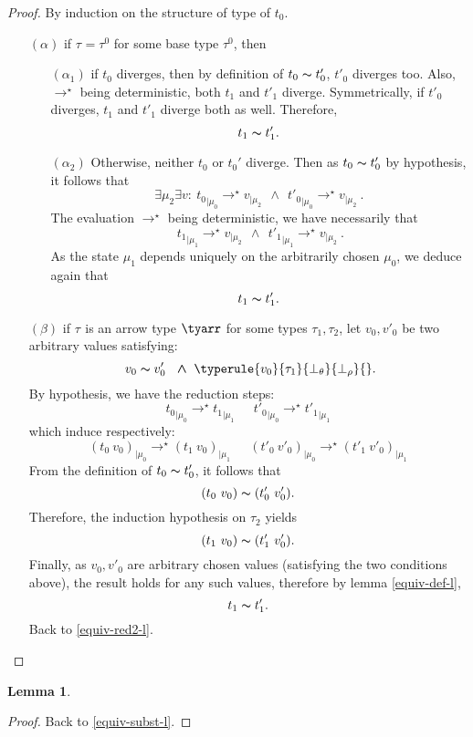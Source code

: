 \documentclass[a4paper,11pt,oneside]{article}
\theoremstyle{plain}
\newtheorem{lemma}[definition]{Lemma}
\newcommand{\tmapp}[2]{(#1 ~ #2)}
\newcommand{\ty}[1][]{\tau_{#1}}
\newcommand{\bwedge}{\boldsymbol{~\wedge~}}
\newcommand{\bth}{\bot_\theta}
\newcommand{\brh}{\bot_\rho}
\newcommand{\evalstar}[4]{~#1_{|\mu_#2} \rightarrow^{\star} #3_{|\mu_#4} ~}
\newcommand{\eqv}[1]{#1 \thicksim #1'}
\begin{document}
	\begin{proof}
		By induction on the structure of type of $t_0$. 
		\begin{itemize}
		\item[$(\alpha)$] if $\ty = \ty^0$ for some base type $\ty^0$, then
		
			\begin{itemize}
			\item[$(\alpha_1)$] if $t_0$ diverges, then by definition of 
			$\eqv{t_0}$, $t'_0$ diverges too. Also, $\rightarrow^\star$ being 
			deterministic, both $t_1$ and $t'_1$ diverge. Symmetrically, if 
			$t'_0$ diverges, $t_1$ and $t'_1$ diverge both as well. Therefore,
			$$\eqv{t_1}.$$
						
			\item[$(\alpha_2)$] Otherwise, neither $t_0$ or $t_{0}'$ diverge. Then
				as $\eqv{t_0}$ by hypothesis, it follows that 
					$$ \exists \mu_2 \exists v: 
					\evalstar{{t_0}}{0}{v}{2} \bwedge \evalstar{{t'_0}}{0}{v}{2}.$$
				The evaluation $\rightarrow^\star$ being deterministic, we have 
				necessarily that
					$$\evalstar{{t_1}}{1}{v}{2} \bwedge \evalstar{{t'_1}}{1}{v}{2}.$$
				As the state $\mu_1$ depends uniquely on the arbitrarily chosen 
				$\mu_0$, we deduce again that $$\eqv{t_1}.$$					
			\end{itemize}			
			
		\item[$(\beta)$] if $\ty$ is an arrow type $\tyarr$ for some types 
		$\ty[1], \ty[2]$,	let $v_0, v'_0$ be two arbitrary values satisfying:
		$$~\eqv{v_0}~\bwedge \typerule{v_0}{\ty[1]}{\bth}{\brh}{}.$$
		By hypothesis, we have the reduction steps:
		$$\evalstar{{t_0}}{0}{{t_1}}{1}\quad\evalstar{{t'_0}}{0}{{t'_1}}{1}$$						which induce respectively: 
		$$\evalstar{\tmapp{t_0}{v_0}}{0}{\tmapp{t_1}{v_0}}{1} \quad
		\evalstar{\tmapp{t'_0}{v'_0}}{0}{\tmapp{t'_1}{v'_0}}{1}$$	
		From the definition of $\eqv{t_0}$, it follows that
		$${\tmapp{t_0}{v_0}} \thicksim {\tmapp{t'_0}{v'_0}}.$$
		Therefore, the induction hypothesis on $\ty[2]$ yields 
		$${\tmapp{t_1}{v_0}}\thicksim{\tmapp{t'_1}{v'_0}}.$$
		Finally, as $v_0, v'_0$ are arbitrary chosen values (satisfying the
		two conditions above), the result holds for any such values, 
		therefore by lemma \ref{equiv-def-l},
		$$\eqv{t_1}.$$ Back to \ref{equiv-red2-l}.	
		\end{itemize}	
	\end{proof}		

	\begin{lemma}

	\label{equiv-subst-p}
	\end{lemma}

	\begin{proof}
	Back to \ref{equiv-subst-l}.
	\end{proof}
	
\newpage


\end{document}
